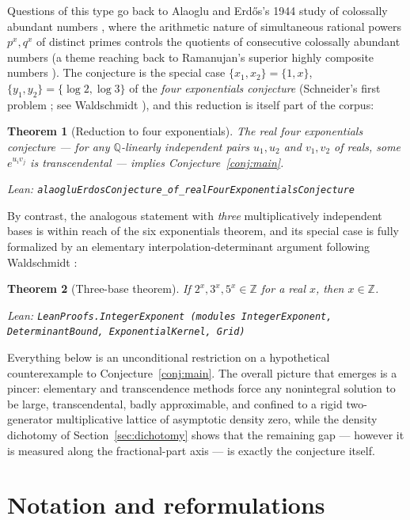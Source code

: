 \documentclass[11pt]{article}
\newtheorem{theorem}{Theorem}[section]
\theoremstyle{definition}
\theoremstyle{remark}
\newcommand{\Z}{\mathbb{Z}}
\newcommand{\Q}{\mathbb{Q}}
\newcommand{\lean}[1]{\par\smallskip\noindent\begingroup\footnotesize\raggedright\emph{Lean:} \texttt{#1}\par\endgroup}
\begin{document}
Questions of this type go back to Alaoglu and Erd\H{o}s's 1944 study of colossally abundant
numbers \cite{AE44}, where the arithmetic nature of simultaneous rational powers
$p^x, q^x$ of distinct primes controls the quotients of consecutive colossally abundant
numbers (a theme reaching back to Ramanujan's superior highly composite numbers
\cite{Ram15}). The conjecture is the special case $\{x_1,x_2\}=\{1,x\}$,
$\{y_1,y_2\}=\{\log 2,\log 3\}$ of the \emph{four exponentials conjecture}
(Schneider's first problem \cite{Schneider57}; see Waldschmidt \cite{Wald00}), and this
reduction is itself part of the corpus:

\begin{theorem}[Reduction to four exponentials]\label{thm:fourexp}
The real four exponentials conjecture --- for any $\Q$-linearly independent pairs
$u_1,u_2$ and $v_1,v_2$ of reals, some $e^{u_iv_j}$ is transcendental --- implies
Conjecture~\ref{conj:main}.
\lean{alaogluErdosConjecture\_of\_realFourExponentialsConjecture}
\end{theorem}

By contrast, the analogous statement with \emph{three} multiplicatively independent bases is
within reach of the six exponentials theorem, and its special case is fully formalized by an
elementary interpolation-determinant argument following Waldschmidt \cite{WaldSix}:

\begin{theorem}[Three-base theorem]\label{thm:threebase}
If $2^x, 3^x, 5^x\in\Z$ for a real $x$, then $x\in\Z$.
\lean{LeanProofs.IntegerExponent (modules IntegerExponent, DeterminantBound,
ExponentialKernel, Grid)}
\end{theorem}

Everything below is an unconditional restriction on a hypothetical counterexample to
Conjecture~\ref{conj:main}. The overall picture that emerges is a pincer: elementary and
transcendence methods force any nonintegral solution to be large, transcendental, badly
approximable, and confined to a rigid two-generator multiplicative lattice of asymptotic
density zero, while the density dichotomy of Section~\ref{sec:dichotomy} shows that the
remaining gap --- however it is measured along the fractional-part axis --- is exactly the
conjecture itself.

\section{Notation and reformulations}\label{sec:notation}
\end{document}
